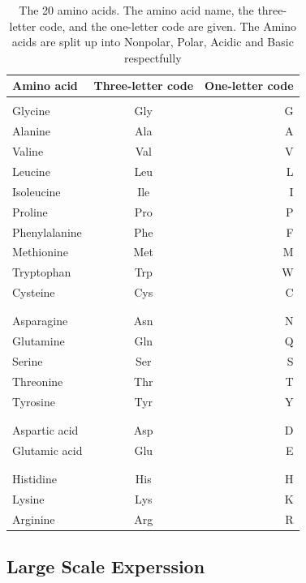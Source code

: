 \documentclass[]{final_report}
\begin{document}
\begin{table}[h!]
    \begin{center}\label{tab:Amino acids}
        \begin{tabular}{l|c|r}
        Amino acid & Three-letter code & One-letter code\\
        \hline
        \\
        Glycine & Gly & G\\
        Alanine & Ala & A\\
        Valine & Val & V\\
        Leucine & Leu & L\\
        Isoleucine & Ile & I\\
        Proline & Pro & P\\
        Phenylalanine & Phe & F\\
        Methionine & Met & M\\
        Tryptophan & Trp & W\\
        Cysteine & Cys & C\\
        \\
        \hline
        \\
        Asparagine & Asn & N\\
        Glutamine & Gln & Q\\
        Serine & Ser & S\\
        Threonine & Thr & T\\
        Tyrosine & Tyr & Y\\
        \\
        \hline
        \\
        Aspartic acid & Asp & D\\
        Glutamic acid & Glu & E\\
        \\
        \hline
        \\
        Histidine & His & H\\
        Lysine & Lys & K\\
        Arginine & Arg & R\\
        \end{tabular}
        \caption{\label{Amino acids}The 20 amino acids. The amino acid name, the three-letter code, and the one-letter code are given. The Amino acids are split up into Nonpolar, Polar, Acidic and Basic respectfully}
    \end{center}
\end{table}
\clearpage

\subsection{Large Scale Experssion}
\end{document}
